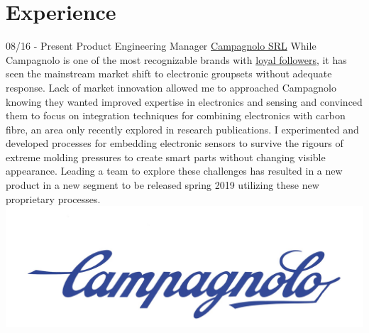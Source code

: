 \documentclass[]{friggeri-cv}
\begin{document}
\section{Experience}
\begin{entrylist}
  \wentry
	{08/16 - Present}
	{Product Engineering Manager}
	{\href{https://www.campagnolo.com}{Campagnolo SRL}}
	{While Campagnolo is one of the most recognizable brands with \href{https://www.google.ca/search?q=campagnolo+tattoo&source=lnms&tbm=isch&sa=X&ved=0ahUKEwj34N_d0MreAhVqqVQKHd3IDLQQ_AUIDigB&biw=1742&bih=850}{loyal followers}, it has seen the mainstream market shift to electronic groupsets without adequate response. Lack of market innovation allowed me to approached Campagnolo knowing they wanted improved expertise in electronics and sensing and convinced them to focus on integration techniques for combining electronics with carbon fibre, an area only recently explored in research publications. I experimented and developed processes for embedding electronic sensors to survive the rigours of extreme molding pressures to create smart parts without changing visible appearance. Leading a team to explore these challenges has resulted in a new product in a new segment to be released spring 2019 utilizing these new proprietary processes.}
	{\includegraphics[scale=0.050]{img/campa_logo.jpg} }


\end{entrylist}
\end{document}
